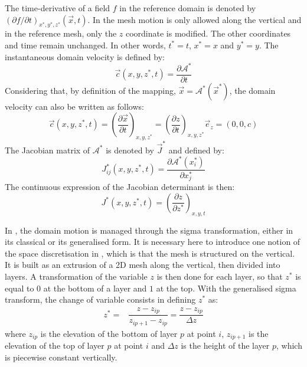 The time-derivative of a field $f$ in the reference domain is
denoted by $\left(\partial f/\partial t\right)_{x^*,y^*,z^*}(\vec{x},t)$.
In  the mesh motion is only allowed along the vertical and in the
reference mesh, only the $z$ coordinate is modified.
The other coordinates and time remain unchanged. In other words, $t^{\ast}=t
$, $x^{\ast}=x$ and $y^{\ast}=y$.
The instantaneous domain velocity is defined by:
\begin{equation}\label{c_def}
\vec{c}(x,y,z^*,t)=\dfrac{\partial \mathcal{A}^*}{\partial t}
\end{equation}
Considering that, by definition of the mapping, $\vec{x}=\mathcal{A}^*(\vec{x}^*)$,
the domain velocity can also be written as follows:
\begin{equation}
\vec{c}(x,y,z^*,t)=\left(\dfrac{\partial \vec{x}}{\partial t}\right)_{x,y,z^*}=\left(\dfrac{\partial z}{\partial t}\right)_{x,y,z^*}\vec{e}_z=\left(0, 0, c\right)
\end{equation}
The Jacobian matrix of $\mathcal{A}^*$ is denoted by $\vec{J}^*$ and defined by:
\begin{equation}
J_{ij}^*(x,y,z^*,t)=\dfrac{\partial \mathcal{A}^*(x^*_i)}{\partial x^*_j}
\end{equation}
The continuous expression of the Jacobian
determinant is then:
\begin{equation}
J^*(x,y,z^*,t)=\left(\dfrac{\partial z}{\partial z^*}\right)_{x,y,t}
\end{equation}

In , the domain motion is managed through the sigma transformation,
either in its classical or its generalised form.
It is necessary here to introduce one notion of the space discretisation in
, which is that the mesh is structured on the vertical.
It is built as an extrusion of a 2D mesh along the vertical, then divided into layers.
A transformation of the variable $z$ is then done for each layer,
so that $z^*$ is equal to $0$ at the bottom of a layer and $1$ at the top.
With the generalised sigma transform, the change of variable consists in defining $z^*$ as:
\begin{align}
z^* =& \dfrac{z-z_{ip}}{z_{ip+1}-z_{ip}} = \dfrac{z-z_{ip}}{\Delta z}
\end{align}
where $z_{ip}$ is the elevation of the bottom of layer $p$ at point $i$,
$z_{ip+1}$ is the elevation of the top of layer $p$ at point $i$ and $\Delta z$ is the height of the layer $p$,
which is piecewise constant vertically.

